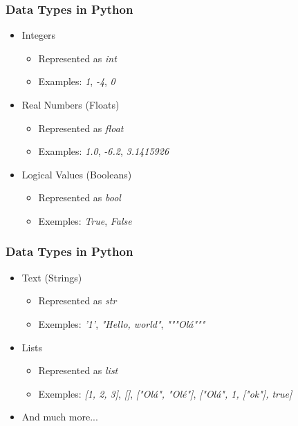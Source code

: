 \documentclass{beamer}
\begin{document}
\begin{frame}
    \frametitle{Data Types in Python}
    \begin{itemize}
        \item Integers
            \begin{itemize}
                \item Represented as \textit{int}
                \item Examples: \textit{1}, \textit{-4}, \textit{0}
            \end{itemize}
        \item Real Numbers (Floats)
            \begin{itemize}
                \item Represented as \textit{float}
                \item Examples: \textit{1.0}, \textit{-6.2}, \textit{3.1415926}
            \end{itemize}
        \item Logical Values (Booleans)
        \begin{itemize}
            \item Represented as \textit{bool}
            \item Exemples: \textit{True}, \textit{False}
        \end{itemize}
    \end{itemize}
\end{frame}

\begin{frame}
    \frametitle{Data Types in Python}
    \begin{itemize}
        \item Text (Strings)
        \begin{itemize}
            \item Represented as \textit{str}
            \item Exemples: \textit{'1'}, \textit{"Hello, world"}, \textit{"""Olá"""}
        \end{itemize}
    \item Lists
        \begin{itemize}
            \item Represented as \textit{list}
            \item Exemples: \textit{[1, 2, 3]}, \textit{[]}, \textit{["Olá", "Olé"]}, \textit{["Olá", 1, ["ok"], true]}
        \end{itemize}
    \item And much more...
    \end{itemize}
\end{frame}
\end{document}

